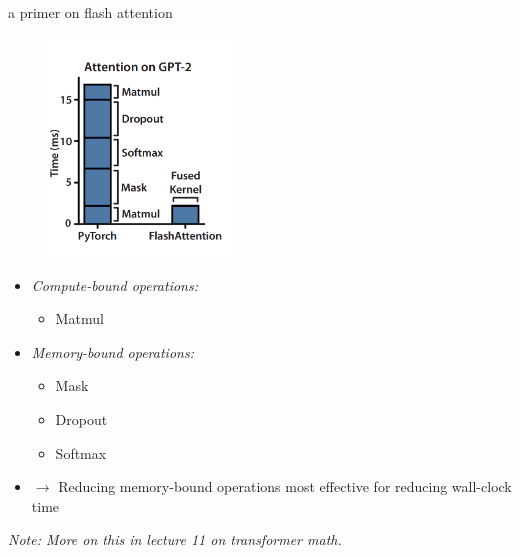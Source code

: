 \begin{frame}{a primer on flash attention}

\begin{minipage}[c]{.49\textwidth}
\vfill
	\begin{figure}
		\centering
		\includegraphics[width = 5cm]{figure/flash-attn.png}\\ 
	\end{figure}
	\vfill
\end{minipage}
\hfill
\begin{minipage}[c]{.49\textwidth}
	\begin{itemize}
	\item \textit{Compute-bound operations:} 
			\begin{itemize}
				\item Matmul
			\end{itemize}
	\item \textit{Memory-bound operations:}
			\begin{itemize}
				\item Mask
				\item Dropout
				\item Softmax
			\end{itemize}
	\item[] $\to$ Reducing memory-bound operations most effective for reducing wall-clock time
	\end{itemize}
\end{minipage}

\textit{Note: More on this in lecture 11 on transformer math.}

\end{frame}


\endlecture

